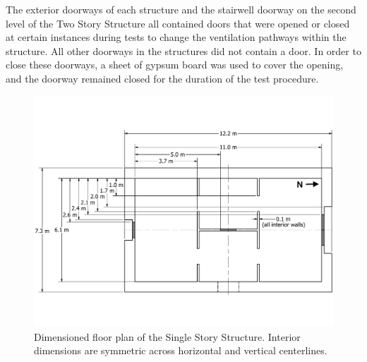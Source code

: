 \documentclass[12pt,oneside]{book}
\begin{document}
The exterior doorways of each structure and the stairwell doorway on the second level of the Two Story Structure all contained doors that were opened or closed at certain instances during tests to change the ventilation pathways within the structure. All other doorways in the structures did not contain a door. In order to close these doorways, a sheet of gypsum board was used to cover the opening, and the doorway remained closed for the duration of the test procedure.
\clearpage

\begin{figure}[!ht]
	\includegraphics[width=\columnwidth]{../Figures/Floor_Plans/East_Test_Structure_Dimensioned_Full}
	\caption[Dimensioned floor plan of the Single Story Structure.]{Dimensioned floor plan of the Single Story Structure. Interior dimensions are symmetric across horizontal and vertical centerlines.}
	\label{fig:east_dimensioned_plan}
\end{figure}
\end{document}
